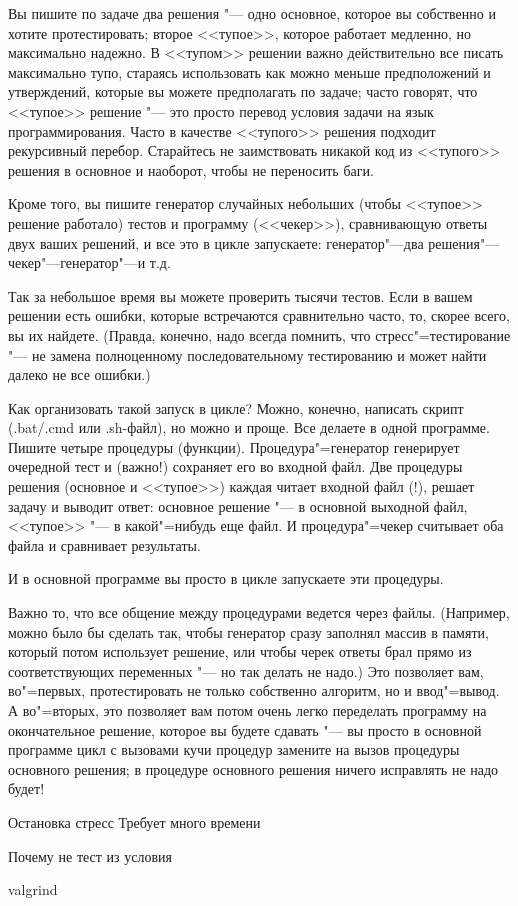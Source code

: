 \documentclass[a4paper,10pt]{problems}
\begin{document}
Вы пишите по задаче два решения "--- одно основное, которое вы собственно и хотите протестировать; второе <<тупое>>, которое работает медленно, но максимально надежно. 
В <<тупом>> решении важно действительно все писать максимально тупо, стараясь использовать как можно меньше предположений и утверждений, 
которые вы можете предполагать по задаче; часто говорят, что <<тупое>> решение "--- это просто перевод условия задачи на язык программирования.
Часто в качестве <<тупого>> решения подходит рекурсивный перебор. 
Старайтесь не заимствовать никакой код из <<тупого>> решения в основное и наоборот, чтобы не переносить баги.

Кроме того, вы пишите генератор случайных небольших (чтобы <<тупое>> решение работало) тестов и программу (<<чекер>>), сравнивающую ответы двух ваших решений,
и все это в цикле запускаете: генератор"---два решения"---чекер"---генератор"---и т.д.

Так за небольшое время вы можете проверить тысячи тестов. 
Если в вашем решении есть ошибки, которые встречаются сравнительно часто, то, скорее всего, вы их найдете.
(Правда, конечно, надо всегда помнить, что стресс"=тестирование "--- не замена полноценному последовательному тестированию и может найти далеко не все ошибки.)

Как организовать такой запуск в цикле? 
Можно, конечно, написать скрипт (.bat/.cmd или .sh-файл), но можно и проще. 
Все делаете в одной программе. Пишите четыре процедуры (функции). 
Процедура"=генератор генерирует очередной тест и (важно!) сохраняет его во входной файл.
Две процедуры решения (основное и <<тупое>>) каждая читает входной файл (!), решает задачу и выводит ответ: основное решение "--- в основной выходной файл,
<<тупое>> "--- в какой"=нибудь еще файл.
И процедура"=чекер считывает оба файла и сравнивает результаты.

И в основной программе вы просто в цикле запускаете эти процедуры.

Важно то, что все общение между процедурами ведется через файлы. 
(Например, можно было бы сделать так, чтобы генератор сразу заполнял массив в памяти, который потом использует решение,
или чтобы черек ответы брал прямо из соответствующих переменных "--- но так делать не надо.)
Это позволяет вам, во"=первых, протестировать не только собственно алгоритм, но и ввод"=вывод.
А во"=вторых, это позволяет вам потом очень легко переделать программу на окончательное решение, которое вы будете сдавать "---
вы просто в основной программе цикл с вызовами кучи процедур замените на вызов процедуры основного решения; в процедуре основного решения ничего исправлять не надо будет!

Остановка стресс
Требует много времени



Почему не тест из условия

valgrind

\end{document}
